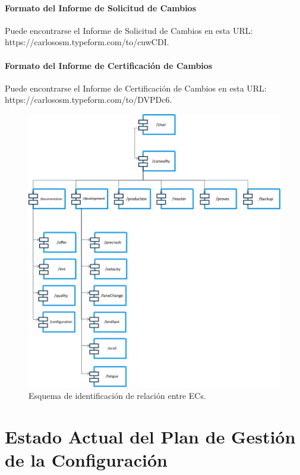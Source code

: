 \subsubsection{Formato del Informe de Solicitud de Cambios}\label{inf:ISC}
Puede encontrarse el Informe de Solicitud de Cambios en esta URL: https://carlososm.typeform.com/to/cuwCDI.
\subsubsection{Formato del Informe de Certificación de Cambios}
Puede encontrarse el Informe de Certificación de Cambios en esta URL: https://carlososm.typeform.com/to/DVPDc6.


\begin{figure}[hb]
\begin{center}
\includegraphics[width=1\textwidth]{./img/softwareLibrary}
\end{center}
\caption{Esquema de identificación de relación entre ECs.}
\label{img:softwareLibrary}
\end{figure}


\appendix
\chapter{Estado Actual del Plan de Gestión de la Configuración}
